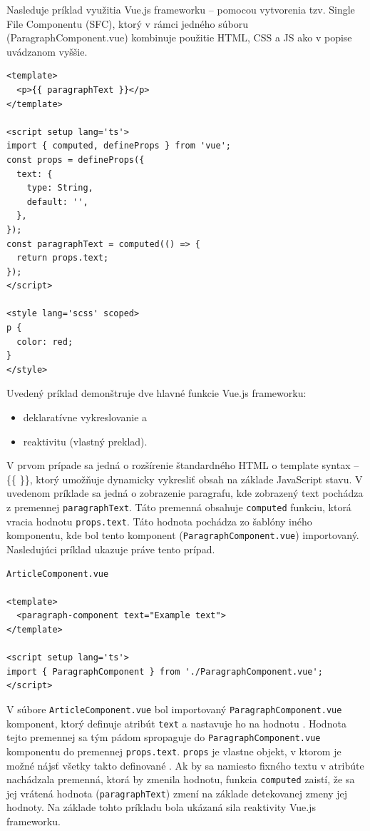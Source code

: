 Nasleduje príklad využitia Vue.js frameworku -- pomocou vytvorenia tzv. Single File Componentu (SFC), ktorý v rámci jedného súboru (ParagraphComponent.vue) kombinuje použitie HTML, CSS a JS ako v popise uvádzanom vyššie.
\begin{verbatim}
<template>
  <p>{{ paragraphText }}</p>
</template>

<script setup lang='ts'>
import { computed, defineProps } from 'vue';
const props = defineProps({
  text: {
    type: String,
    default: '',
  },
});
const paragraphText = computed(() => {
  return props.text;
});
</script>

<style lang='scss' scoped>
p {
  color: red;
}
</style>
\end{verbatim}

Uvedený príklad demonštruje dve hlavné funkcie Vue.js frameworku:
\begin {itemize}
\item {deklaratívne vykreslovanie a}
\item {reaktivitu \cite{vuejs_introduction} (vlastný preklad).}
\end {itemize}

V prvom prípade sa jedná o rozšírenie štandardného HTML o template syntax -- \{\{ \}\}, ktorý umožňuje dynamicky vykresliť obsah na základe JavaScript stavu. V uvedenom príklade sa jedná o zobrazenie paragrafu, kde zobrazený text pochádza z premennej \texttt{paragraphText}. Táto premenná obsahuje \texttt{computed} funkciu, ktorá vracia hodnotu \texttt{props.text}. Táto hodnota pochádza zo šablóny iného komponentu, kde bol tento komponent \newline (\texttt{ParagraphComponent.vue}) importovaný. 
Nasledujúci príklad ukazuje práve tento prípad.

\begin{verbatim}
ArticleComponent.vue

<template>
  <paragraph-component text="Example text">
</template>

<script setup lang='ts'>
import { ParagraphComponent } from './ParagraphComponent.vue';
</script>
\end{verbatim}

V súbore \texttt{ArticleComponent.vue} bol importovaný \newline \texttt{ParagraphComponent.vue} komponent, ktorý definuje atribút \texttt{text} a nastavuje ho na hodnotu . Hodnota tejto premennej sa tým pádom spropaguje do \newline
\texttt{ParagraphComponent.vue} komponentu do premennej \texttt{props.text}. \texttt{props} je vlastne objekt, v ktorom je možné nájsť všetky takto definované . Ak by sa namiesto fixného textu v atribúte  nachádzala premenná, ktorá by zmenila hodnotu, funkcia \texttt{computed} zaistí, že sa jej vrátená hodnota (\texttt{paragraphText}) zmení na základe detekovanej zmeny jej hodnoty.
Na základe tohto príkladu bola ukázaná sila reaktivity Vue.js frameworku.

